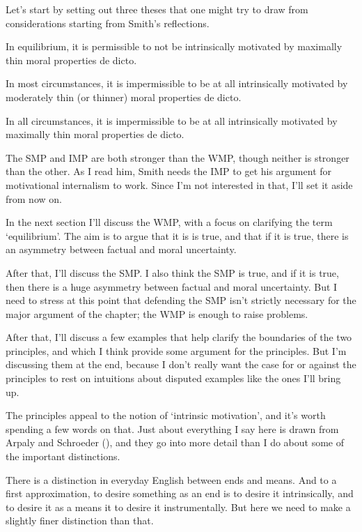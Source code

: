 \documentclass[
  10pt,
  letterpaper,
  twoside]{scrbook}
\providecommand{\tightlist}{%
  \setlength{\itemsep}{0pt}\setlength{\parskip}{0pt}}\usepackage{longtable,booktabs,array}
\begin{document}
Let's start by setting out three theses that one might try to draw from
considerations starting from Smith's reflections.

\begin{description}
\tightlist
\item[Weak Motivation Principle (WMP)]
In equilibrium, it is permissible to not be intrinsically motivated by
maximally thin moral properties de dicto.
\item[Strong Motivation Principle (SMP)]
In most circumstances, it is impermissible to be at all intrinsically
motivated by moderately thin (or thinner) moral properties de dicto.
\item[Ideal Motivation Principle (IMP)]
In all circumstances, it is impermissible to be at all intrinsically
motivated by maximally thin moral properties de dicto.
\end{description}

The SMP and IMP are both stronger than the WMP, though neither is
stronger than the other. As I read him, Smith needs the IMP to get his
argument for motivational internalism to work. Since I'm not interested
in that, I'll set it aside from now on.

In the next section I'll discuss the WMP, with a focus on clarifying the
term `equilibrium'. The aim is to argue that it is is true, and that if
it is true, there is an asymmetry between factual and moral uncertainty.

After that, I'll discuss the SMP. I also think the SMP is true, and if
it is true, then there is a huge asymmetry between factual and moral
uncertainty. But I need to stress at this point that defending the SMP
isn't strictly necessary for the major argument of the chapter; the WMP
is enough to raise problems.

After that, I'll discuss a few examples that help clarify the boundaries
of the two principles, and which I think provide some argument for the
principles. But I'm discussing them at the end, because I don't really
want the case for or against the principles to rest on intuitions about
disputed examples like the ones I'll bring up.

The principles appeal to the notion of `intrinsic motivation', and it's
worth spending a few words on that. Just about everything I say here is
drawn from Arpaly and Schroeder
(), and they go into more
detail than I do about some of the important distinctions.

There is a distinction in everyday English between ends and means. And
to a first approximation, to desire something as an end is to desire it
intrinsically, and to desire it as a means it to desire it
instrumentally. But here we need to make a slightly finer distinction
than that.
\end{document}
